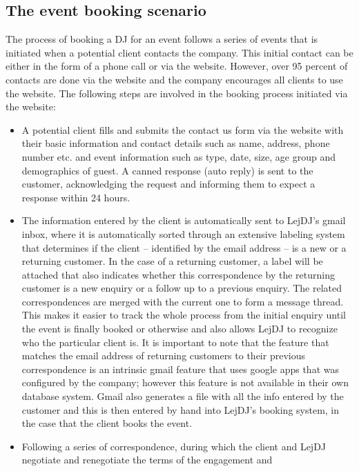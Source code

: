 \documentclass[envcountsame]{llncs}
\begin{document}
\subsection{The event booking scenario}

The process of booking a DJ for an event follows a series of events
that is initiated when a potential client contacts the company. This
initial contact can be either in the form of a phone call or via the
website. However, over 95 percent of contacts are done via the website
and the company encourages all clients to use the website. The
following steps are involved in the booking process initiated via the
website:

\begin{itemize}
\item A potential client fills and submits the contact us form via the
  website with their basic information and contact details such as
  name, address, phone number etc. and event information such as type,
  date, size, age group and demographics of guest. A canned response
  (auto reply) is sent to the customer, acknowledging the request and
  informing them to expect a response within 24 hours.
\item The information entered by the client is automatically sent to
  LejDJ’s gmail inbox, where it is automatically sorted through an
  extensive labeling system that determines if the client --
  identified by the email address -- is a new or a returning
  customer. In the case of a returning customer, a label will be
  attached that also indicates whether this correspondence by the
  returning customer is a new enquiry or a follow up to a previous
  enquiry.  The related correspondences are merged with the current
  one to form a message thread. This makes it easier to track the
  whole process from the initial enquiry until the event is finally
  booked or otherwise and also allows LejDJ to recognize who the
  particular client is. It is important to note that the feature that
  matches the email address of returning customers to their previous
  correspondence is an intrinsic gmail feature that uses google apps
  that was configured by the company; however this feature is not
  available in their own database system. Gmail also generates a file
  with all the info entered by the customer and this is then entered
  by hand into LejDJ’s booking system, in the case that the client
  books the event.
\item Following a series of correspondence, during which the client
  and LejDJ negotiate and renegotiate the terms of the engagement and

\end{itemize}
\end{document}
